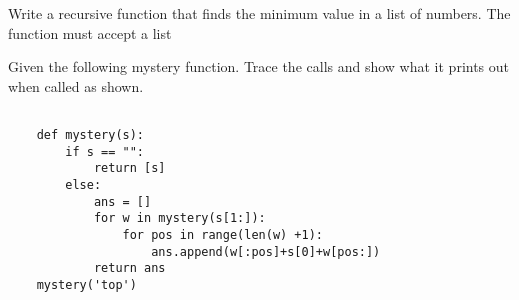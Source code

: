 \documentclass[11pt]{exam}
\begin{document}
\begin{questions}
\newpage
\question Write a recursive function that finds the minimum value in a list of numbers.  The function must accept a list

\newpage

\question[20] Given the following mystery function.  Trace the calls and show what it prints out when called as shown.
\begin{lstlisting}[label=lst:mystery,float=htbp] %python

	def mystery(s):
	    if s == "":
	        return [s]
	    else:
	        ans = []
	        for w in mystery(s[1:]):
	            for pos in range(len(w) +1):
	                ans.append(w[:pos]+s[0]+w[pos:])
	        return ans
	mystery('top')
\end{lstlisting}
\vspace{5in}


\end{questions}
\end{document}
